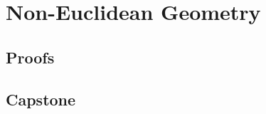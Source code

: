 \chapter{Non-Euclidean Geometry}
\label{chap:non-euclidean-geometry}




\LRAExcludeFromPrintEditionBegin
\section*{Proofs}


\section*{Capstone}

\LRAExcludeFromPrintEditionEnd
